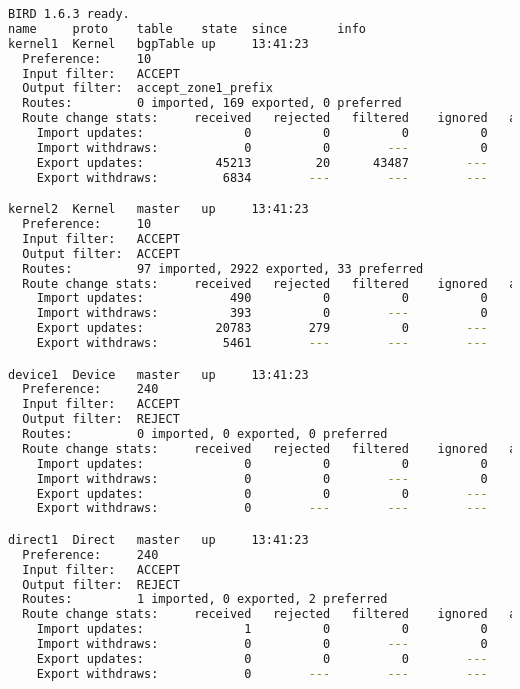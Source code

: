 \begin{lstlisting}[language=bash, caption={Birdc4 show protocols all}]
BIRD 1.6.3 ready.
name     proto    table    state  since       info
kernel1  Kernel   bgpTable up     13:41:23
  Preference:     10
  Input filter:   ACCEPT
  Output filter:  accept_zone1_prefix
  Routes:         0 imported, 169 exported, 0 preferred
  Route change stats:     received   rejected   filtered    ignored   accepted
    Import updates:              0          0          0          0          0
    Import withdraws:            0          0        ---          0          0
    Export updates:          45213         20      43487        ---       1706
    Export withdraws:         6834        ---        ---        ---        427

kernel2  Kernel   master   up     13:41:23
  Preference:     10
  Input filter:   ACCEPT
  Output filter:  ACCEPT
  Routes:         97 imported, 2922 exported, 33 preferred
  Route change stats:     received   rejected   filtered    ignored   accepted
    Import updates:            490          0          0          0        490
    Import withdraws:          393          0        ---          0        393
    Export updates:          20783        279          0        ---      20504
    Export withdraws:         5461        ---        ---        ---       5371

device1  Device   master   up     13:41:23
  Preference:     240
  Input filter:   ACCEPT
  Output filter:  REJECT
  Routes:         0 imported, 0 exported, 0 preferred
  Route change stats:     received   rejected   filtered    ignored   accepted
    Import updates:              0          0          0          0          0
    Import withdraws:            0          0        ---          0          0
    Export updates:              0          0          0        ---          0
    Export withdraws:            0        ---        ---        ---          0

direct1  Direct   master   up     13:41:23
  Preference:     240
  Input filter:   ACCEPT
  Output filter:  REJECT
  Routes:         1 imported, 0 exported, 2 preferred
  Route change stats:     received   rejected   filtered    ignored   accepted
    Import updates:              1          0          0          0          1
    Import withdraws:            0          0        ---          0          0
    Export updates:              0          0          0        ---          0
    Export withdraws:            0        ---        ---        ---          0


\end{lstlisting}
